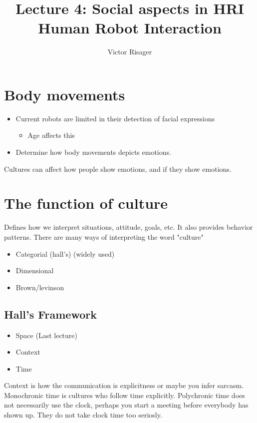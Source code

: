 \documentclass[a4paper]{article}
\title{Lecture 4: Social aspects in HRI  \\
	\large Human Robot Interaction}
\author{Victor Risager}
\begin{document}
\maketitle

\section{Body movements}
\begin{itemize}
	\item Current robots are limited in their detection of facial expressions
		\begin{itemize}
			\item Age affects this
		\end{itemize}
	\item Determine how body movements depicts emotions. 
\end{itemize}

Cultures can affect how people show emotions, and if they show emotions. 

\section{The function of culture}
Defines how we interpret situations, attitude, goals, etc. It also provides behavior patterns. There are many ways of interpreting the word "culture"
\begin{itemize}
	\item Categorial (hall's) (widely used)
	\item Dimensional
	\item Brown/levinson
\end{itemize}

\subsection{Hall's Framework}
\begin{itemize}
	\item Space (Last lecture)
	\item Context
	\item Time
\end{itemize}

Context is how the communication is explicitness or maybe you infer sarcasm. \\
Monochronic time is cultures who follow time explicitly. 
Polychronic time does not necessarily use the clock, perhaps you start a meeting before everybody has shown up. They do not take clock time too seriosly.
\end{document}
